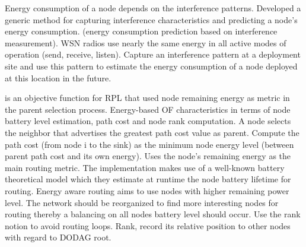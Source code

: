 Energy consumption of a node depends on the interference patterns. Developed a generic method for capturing interference characteristics and predicting a node's energy consumption. (energy consumption prediction based on interference measurement). WSN radios use nearly the same energy in all active modes of operation (send, receive, listen). Capture an interference pattern at a deployment site and use this pattern to estimate the energy consumption of a node deployed at this location in the future. \cite{alexlifetime}

\cite{energyrpl} is an objective function for RPL that used node remaining energy as metric in the parent selection process. Energy-based OF characteristics in terms of node battery level estimation, path cost and node rank computation. A node selects the neighbor that advertises the greatest path cost value as parent. Compute the path cost (from node i to the sink) as the minimum node energy level (between parent path cost and its own energy). Uses the node's remaining energy as the main routing metric. The implementation makes use of a well-known battery theoretical model which they estimate at runtime the node battery lifetime for routing. Energy aware routing aims to use nodes with higher remaining power level. The network should be reorganized to find more interesting nodes for routing thereby a balancing on all nodes battery level should occur. Use the rank notion to avoid routing loops. Rank, record its relative position to other nodes with regard to DODAG root. 